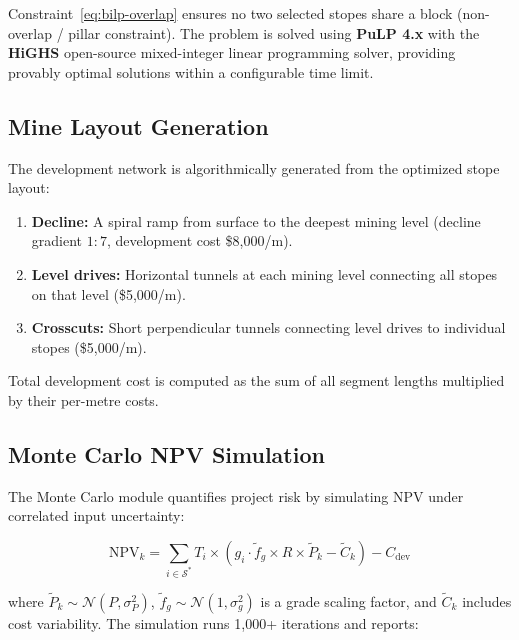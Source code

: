 \documentclass[12pt,a4paper]{article}
\begin{document}
Constraint~\eqref{eq:bilp-overlap} ensures no two selected stopes share a block (non-overlap / pillar constraint). The problem is solved using \textbf{PuLP 4.x} with the \textbf{HiGHS} open-source mixed-integer linear programming solver, providing provably optimal solutions within a configurable time limit.

\subsection{Mine Layout Generation}
\label{sec:mine-layout}

The development network is algorithmically generated from the optimized stope layout:

\begin{enumerate}
    \item \textbf{Decline:} A spiral ramp from surface to the deepest mining level (decline gradient $1:7$, development cost \$8{,}000/m).
    \item \textbf{Level drives:} Horizontal tunnels at each mining level connecting all stopes on that level (\$5{,}000/m).
    \item \textbf{Crosscuts:} Short perpendicular tunnels connecting level drives to individual stopes (\$5{,}000/m).
\end{enumerate}

Total development cost is computed as the sum of all segment lengths multiplied by their per-metre costs.

\subsection{Monte Carlo NPV Simulation}
\label{sec:monte-carlo}

The Monte Carlo module quantifies project risk by simulating NPV under correlated input uncertainty:

\begin{equation}
    \text{NPV}_k = \sum_{i \in \mathcal{S}^*} T_i \times \left( g_i \cdot \tilde{f}_g \times R \times \tilde{P}_k - \tilde{C}_k \right) - C_{\text{dev}}
\end{equation}

where $\tilde{P}_k \sim \mathcal{N}(P, \sigma_P^2)$, $\tilde{f}_g \sim \mathcal{N}(1, \sigma_g^2)$ is a grade scaling factor, and $\tilde{C}_k$ includes cost variability. The simulation runs 1{,}000+ iterations and reports:
\end{document}
